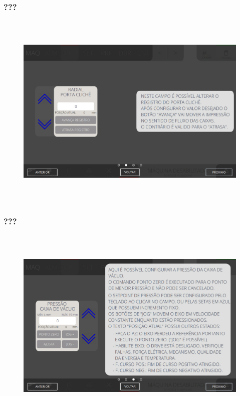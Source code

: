 \newpage
\thispagestyle{fancy}
\vspace*{\fill}
\subsubsection{\small{???}}
\begin{figure}[h]
  \centering
  \includegraphics[width=576px,height=360px]{src/imagesFlexo/04-printter/02-printter/settings/e-2.png}
   \label{}
\end{figure}
\vspace*{\fill}

\newpage
\thispagestyle{fancy}
\vspace*{\fill}
\subsubsection{\small{???}}
\begin{figure}[h]
  \centering
  \includegraphics[width=576px,height=360px]{src/imagesFlexo/04-printter/02-printter/settings/e-3.png}
   \label{}
\end{figure}
\vspace*{\fill}

